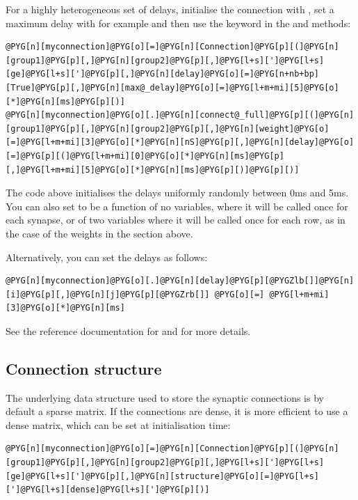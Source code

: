 \documentclass[letterpaper,10pt,english]{manual}
\begin{document}
For a highly heterogeneous set of delays, initialise the connection with , set
a maximum delay with for example  and
then use the  keyword in the  and
 methods:

\begin{Verbatim}[commandchars=@\[\]]
@PYG[n][myconnection]@PYG[o][=]@PYG[n][Connection]@PYG[p][(]@PYG[n][group1]@PYG[p][,]@PYG[n][group2]@PYG[p][,]@PYG[l+s][']@PYG[l+s][ge]@PYG[l+s][']@PYG[p][,]@PYG[n][delay]@PYG[o][=]@PYG[n+nb+bp][True]@PYG[p][,]@PYG[n][max@_delay]@PYG[o][=]@PYG[l+m+mi][5]@PYG[o][*]@PYG[n][ms]@PYG[p][)]
@PYG[n][myconnection]@PYG[o][.]@PYG[n][connect@_full]@PYG[p][(]@PYG[n][group1]@PYG[p][,]@PYG[n][group2]@PYG[p][,]@PYG[n][weight]@PYG[o][=]@PYG[l+m+mi][3]@PYG[o][*]@PYG[n][nS]@PYG[p][,]@PYG[n][delay]@PYG[o][=]@PYG[p][(]@PYG[l+m+mi][0]@PYG[o][*]@PYG[n][ms]@PYG[p][,]@PYG[l+m+mi][5]@PYG[o][*]@PYG[n][ms]@PYG[p][)]@PYG[p][)]
\end{Verbatim}

The code above initialises the delays uniformly randomly between 0ms and 5ms. You can also
set  to be a function of no variables, where it will be called once for each synapse,
or of two variables  where it will be called once for each row, as in the case of the
weights in the section above.

Alternatively, you can set the delays as follows:

\begin{Verbatim}[commandchars=@\[\]]
@PYG[n][myconnection]@PYG[o][.]@PYG[n][delay]@PYG[p][@PYGZlb[]]@PYG[n][i]@PYG[p][,]@PYG[n][j]@PYG[p][@PYGZrb[]] @PYG[o][=] @PYG[l+m+mi][3]@PYG[o][*]@PYG[n][ms]
\end{Verbatim}

See the reference documentation for \hyperlink{brian.Connection}{} and \hyperlink{brian.DelayConnection}{} for
more details.


\subsection{Connection structure}

The underlying data structure used to store the synaptic connections is by default a sparse
matrix. If the connections are dense, it is more efficient to use a dense matrix, which can be
set at initialisation time:

\begin{Verbatim}[commandchars=@\[\]]
@PYG[n][myconnection]@PYG[o][=]@PYG[n][Connection]@PYG[p][(]@PYG[n][group1]@PYG[p][,]@PYG[n][group2]@PYG[p][,]@PYG[l+s][']@PYG[l+s][ge]@PYG[l+s][']@PYG[p][,]@PYG[n][structure]@PYG[o][=]@PYG[l+s][']@PYG[l+s][dense]@PYG[l+s][']@PYG[p][)]
\end{Verbatim}
\end{document}
